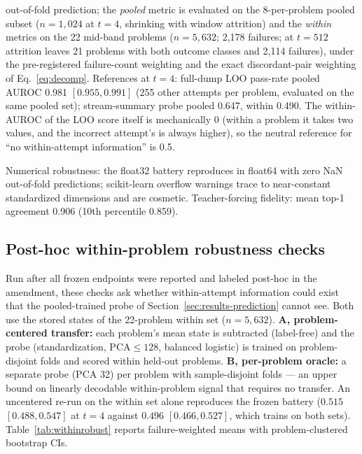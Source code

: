 \begin{table}[htbp]
{out-of-fold prediction; the \emph{pooled} metric is evaluated on the
8-per-problem pooled subset ($n{=}1{,}024$ at $t{=}4$, shrinking with
window attrition) and the \emph{within} metrics on the 22 mid-band
problems ($n{=}5{,}632$; 2{,}178 failures; at $t{=}512$ attrition leaves
21 problems with both outcome classes and 2{,}114 failures), under the pre-registered
failure-count weighting and the exact discordant-pair weighting of
Eq.~\eqref{eq:decomp}. References at $t{=}4$: full-dump LOO pass-rate
pooled AUROC 0.981 $[0.955{,} 0.991]$ (255 other attempts per problem,
evaluated on the same pooled set); stream-summary probe
pooled 0.647, within 0.490. The within-AUROC of the LOO score itself is
mechanically 0 (within a problem it takes two values, and the incorrect
attempt's is always higher), so the neutral reference for ``no
within-attempt information'' is 0.5.}
\label{tab:dissect}\end{table}

Numerical robustness: the float32 battery reproduces in float64 with zero
NaN out-of-fold predictions; scikit-learn overflow warnings trace to
near-constant standardized dimensions and are cosmetic. Teacher-forcing
fidelity: mean top-1 agreement 0.906 (10th percentile 0.859).

\subsection{Post-hoc within-problem robustness checks}\label{app:within-robust}

Run after all frozen endpoints were reported and labeled post-hoc in the
amendment, these checks ask whether within-attempt information could
exist that the pooled-trained probe of
Section~\ref{sec:results-prediction} cannot see. Both use the stored
states of the 22-problem within set ($n{=}5{,}632$). \textbf{A,
problem-centered transfer:} each problem's mean state is subtracted
(label-free) and the probe (standardization, PCA${}\le 128$, balanced
logistic) is trained on problem-disjoint folds and scored within held-out
problems. \textbf{B, per-problem oracle:} a separate probe (PCA 32) per
problem with sample-disjoint folds --- an upper bound on linearly
decodable within-problem signal that requires no transfer. An uncentered
re-run on the within set alone reproduces the frozen battery ($0.515$
$[0.488, 0.547]$ at $t{=}4$ against $0.496$ $[0.466, 0.527]$, which trains
on both sets). Table~\ref{tab:withinrobust} reports failure-weighted means
with problem-clustered bootstrap CIs.


